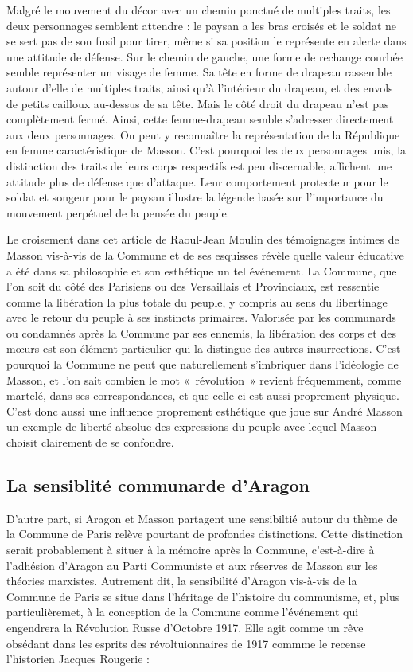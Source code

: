  Malgré le mouvement du décor avec un chemin ponctué de multiples traits, les deux personnages semblent attendre : le paysan a les bras croisés et le soldat ne se sert pas de son fusil pour tirer, même si sa position le représente en alerte dans une attitude de défense. Sur le chemin de gauche, une forme de rechange courbée semble représenter un visage de femme. Sa tête en forme de drapeau rassemble autour d’elle de multiples traits, ainsi qu’à l’intérieur du drapeau, et des envols de petits cailloux au-dessus de sa tête. Mais le côté droit du drapeau n’est pas complètement fermé. Ainsi, cette femme-drapeau semble s’adresser directement aux deux personnages. On peut y reconnaître la représentation de la République en femme caractéristique de Masson. C’est pourquoi les deux personnages unis, la distinction des traits de leurs corps respectifs est peu discernable, affichent une attitude plus de défense que d’attaque. Leur comportement protecteur pour le soldat et songeur pour le paysan illustre la légende basée sur l’importance du mouvement perpétuel de la pensée du peuple. 

 Le croisement dans cet article de Raoul-Jean Moulin des témoignages intimes de Masson vis-à-vis de la Commune et de ses esquisses révèle quelle valeur éducative a été dans sa philosophie et son esthétique un tel événement. La Commune, que l’on soit du côté des Parisiens ou des Versaillais et Provinciaux, est ressentie comme la libération la plus totale du peuple, y compris au sens du libertinage avec le retour du peuple à ses instincts primaires. Valorisée par les communards ou condamnés après la Commune par ses ennemis, la libération des corps et des m\oe{}urs est son élément particulier qui la distingue des autres insurrections. C’est pourquoi la Commune ne peut que naturellement s’imbriquer dans l’idéologie de Masson, et l’on sait combien le mot « révolution » revient fréquemment, comme martelé, dans ses correspondances, et que celle-ci est aussi proprement physique. C’est donc aussi une influence proprement esthétique que joue sur André Masson un exemple de liberté absolue des expressions du peuple avec lequel Masson choisit clairement de se confondre. 

\subsection{La sensiblité communarde d'Aragon}

D'autre part, si Aragon et Masson partagent une sensibiltié autour du thème de la Commune de Paris relève pourtant de profondes distinctions. Cette distinction serait probablement à situer à la mémoire après la Commune, c'est-à-dire à l'adhésion d'Aragon au Parti Communiste et aux réserves de Masson sur les théories marxistes. Autrement dit, la sensibilité d'Aragon vis-à-vis de la Commune de Paris se situe dans l'héritage de l'histoire du communisme, et, plus particulièremet, à la conception de la Commune comme l'événement qui engendrera la Révolution Russe d'Octobre 1917. Elle agit comme un rêve obsédant  dans les esprits des révoltuionnaires de 1917 commme le recense l'historien Jacques Rougerie : 

